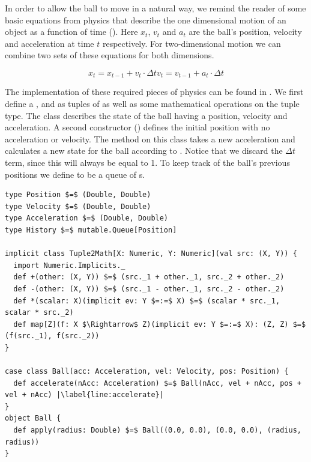 In order to allow the ball to move in a natural way, we remind the reader of some basic equations from physics that describe the one dimensional motion of an object as a function of time (). Here $x_t$, $v_t$ and $a_t$ are the ball's position, velocity and acceleration at time $t$ respectively. For two-dimensional motion we can combine two sets of these equations for both dimensions.

\begin{subequations}
	\begin{equation}
		x_t = x_{t - 1} + v_t \cdot \Delta t
	\end{equation}
	\begin{equation}
		v_t = v_{t - 1} + a_t \cdot \Delta t
	\end{equation}
	\label{eq:motion}
\end{subequations}

The implementation of these required pieces of physics can be found in . We first define a ,  and  as tuples of  as well as some mathematical operations on the tuple type. The  class describes the state of the ball having a position, velocity and acceleration. A second constructor () defines the initial position with no acceleration or velocity. The method  on this class takes a new acceleration and calculates a new state for the ball according to . Notice that we discard the $\Delta t$ term, since this will always be equal to 1. To keep track of the ball's previous positions we define  to be a queue of s.

\begin{minipage}{\linewidth}
\begin{lstlisting}[style=ScalaStyle, caption={Ball motion physics}, label={lst:ball-physics}]
type Position $=$ (Double, Double)
type Velocity $=$ (Double, Double)
type Acceleration $=$ (Double, Double)
type History $=$ mutable.Queue[Position]

implicit class Tuple2Math[X: Numeric, Y: Numeric](val src: (X, Y)) {
  import Numeric.Implicits._
  def +(other: (X, Y)) $=$ (src._1 + other._1, src._2 + other._2)
  def -(other: (X, Y)) $=$ (src._1 - other._1, src._2 - other._2)
  def *(scalar: X)(implicit ev: Y $=:=$ X) $=$ (scalar * src._1, scalar * src._2)
  def map[Z](f: X $\Rightarrow$ Z)(implicit ev: Y $=:=$ X): (Z, Z) $=$ (f(src._1), f(src._2))
}

case class Ball(acc: Acceleration, vel: Velocity, pos: Position) {
  def accelerate(nAcc: Acceleration) $=$ Ball(nAcc, vel + nAcc, pos + vel + nAcc) |\label{line:accelerate}|
}
object Ball {
  def apply(radius: Double) $=$ Ball((0.0, 0.0), (0.0, 0.0), (radius, radius))
}
\end{lstlisting}
\end{minipage}

